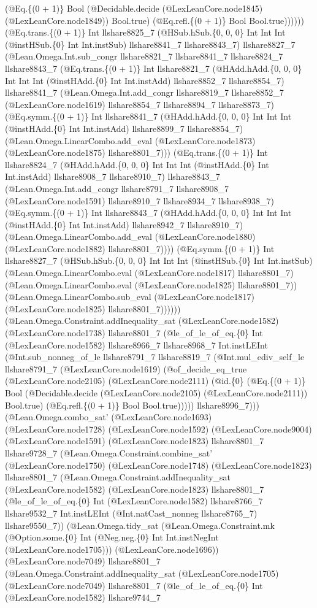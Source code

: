 \documentclass[11pt]{article}
\begin{document}
(@Eq.\{(0 + 1)\} Bool (@Decidable.decide (@LexLeanCore.node1845) (@LexLeanCore.node1849)) Bool.true) (@Eq.refl.\{(0 + 1)\} Bool Bool.true)))))) (@Eq.trans.\{(0 + 1)\} Int llshare8825\_7 (@HSub.hSub.\{0, 0, 0\} Int Int Int (@instHSub.\{0\} Int Int.instSub) llshare8841\_7 llshare8843\_7) llshare8827\_7 (@Lean.Omega.Int.sub\_congr llshare8821\_7 llshare8841\_7 llshare8824\_7 llshare8843\_7 (@Eq.trans.\{(0 + 1)\} Int llshare8821\_7 (@HAdd.hAdd.\{0, 0, 0\} Int Int Int (@instHAdd.\{0\} Int Int.instAdd) llshare8852\_7 llshare8854\_7) llshare8841\_7 (@Lean.Omega.Int.add\_congr llshare8819\_7 llshare8852\_7 (@LexLeanCore.node1619) llshare8854\_7 llshare8894\_7 llshare8873\_7) (@Eq.symm.\{(0 + 1)\} Int llshare8841\_7 (@HAdd.hAdd.\{0, 0, 0\} Int Int Int (@instHAdd.\{0\} Int Int.instAdd) llshare8899\_7 llshare8854\_7) (@Lean.Omega.LinearCombo.add\_eval (@LexLeanCore.node1873) (@LexLeanCore.node1875) llshare8801\_7))) (@Eq.trans.\{(0 + 1)\} Int llshare8824\_7 (@HAdd.hAdd.\{0, 0, 0\} Int Int Int (@instHAdd.\{0\} Int Int.instAdd) llshare8908\_7 llshare8910\_7) llshare8843\_7 (@Lean.Omega.Int.add\_congr llshare8791\_7 llshare8908\_7 (@LexLeanCore.node1591) llshare8910\_7 llshare8934\_7 llshare8938\_7) (@Eq.symm.\{(0 + 1)\} Int llshare8843\_7 (@HAdd.hAdd.\{0, 0, 0\} Int Int Int (@instHAdd.\{0\} Int Int.instAdd) llshare8942\_7 llshare8910\_7) (@Lean.Omega.LinearCombo.add\_eval (@LexLeanCore.node1880) (@LexLeanCore.node1882) llshare8801\_7)))) (@Eq.symm.\{(0 + 1)\} Int llshare8827\_7 (@HSub.hSub.\{0, 0, 0\} Int Int Int (@instHSub.\{0\} Int Int.instSub) (@Lean.Omega.LinearCombo.eval (@LexLeanCore.node1817) llshare8801\_7) (@Lean.Omega.LinearCombo.eval (@LexLeanCore.node1825) llshare8801\_7)) (@Lean.Omega.LinearCombo.sub\_eval (@LexLeanCore.node1817) (@LexLeanCore.node1825) llshare8801\_7)))))) (@Lean.Omega.Constraint.addInequality\_sat (@LexLeanCore.node1582) (@LexLeanCore.node1738) llshare8801\_7 (@le\_of\_le\_of\_eq.\{0\} Int (@LexLeanCore.node1582) llshare8966\_7 llshare8968\_7 Int.instLEInt (@Int.sub\_nonneg\_of\_le llshare8791\_7 llshare8819\_7 (@Int.mul\_ediv\_self\_le llshare8791\_7 (@LexLeanCore.node1619) (@of\_decide\_eq\_true (@LexLeanCore.node2105) (@LexLeanCore.node2111) (@id.\{0\} (@Eq.\{(0 + 1)\} Bool (@Decidable.decide (@LexLeanCore.node2105) (@LexLeanCore.node2111)) Bool.true) (@Eq.refl.\{(0 + 1)\} Bool Bool.true))))) llshare8996\_7))) (@Lean.Omega.combo\_sat' (@LexLeanCore.node1693) (@LexLeanCore.node1728) (@LexLeanCore.node1592) (@LexLeanCore.node9004) (@LexLeanCore.node1591) (@LexLeanCore.node1823) llshare8801\_7 llshare9728\_7 (@Lean.Omega.Constraint.combine\_sat' (@LexLeanCore.node1750) (@LexLeanCore.node1748) (@LexLeanCore.node1823) llshare8801\_7 (@Lean.Omega.Constraint.addInequality\_sat (@LexLeanCore.node1582) (@LexLeanCore.node1823) llshare8801\_7 (@le\_of\_le\_of\_eq.\{0\} Int (@LexLeanCore.node1582) llshare8766\_7 llshare9532\_7 Int.instLEInt (@Int.natCast\_nonneg llshare8765\_7) llshare9550\_7)) (@Lean.Omega.tidy\_sat (@Lean.Omega.Constraint.mk (@Option.some.\{0\} Int (@Neg.neg.\{0\} Int Int.instNegInt (@LexLeanCore.node1705))) (@LexLeanCore.node1696)) (@LexLeanCore.node7049) llshare8801\_7 (@Lean.Omega.Constraint.addInequality\_sat (@LexLeanCore.node1705) (@LexLeanCore.node7049) llshare8801\_7 (@le\_of\_le\_of\_eq.\{0\} Int (@LexLeanCore.node1582) llshare9744\_7 
\end{document}

